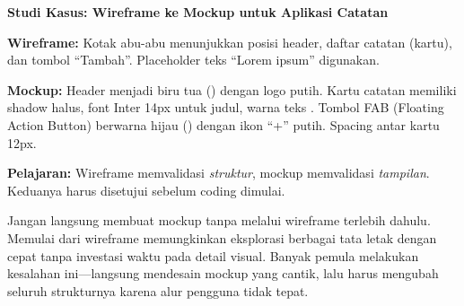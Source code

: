 \begin{contoh}
\textbf{Studi Kasus: Wireframe ke Mockup untuk Aplikasi Catatan}

\textbf{Wireframe:} Kotak abu-abu menunjukkan posisi header, daftar catatan (kartu), dan tombol ``Tambah''. Placeholder teks ``Lorem ipsum'' digunakan.

\textbf{Mockup:} Header menjadi biru tua () dengan logo putih. Kartu catatan memiliki shadow halus, font Inter 14px untuk judul, warna teks . Tombol FAB (Floating Action Button) berwarna hijau () dengan ikon ``+'' putih. Spacing antar kartu 12px.

\textbf{Pelajaran:} Wireframe memvalidasi \textit{struktur}, mockup memvalidasi \textit{tampilan}. Keduanya harus disetujui sebelum coding dimulai.
\end{contoh}

\begin{catatan}
Jangan langsung membuat mockup tanpa melalui wireframe terlebih dahulu. Memulai dari wire\-frame memungkinkan eksplorasi berbagai tata letak dengan cepat tanpa investasi waktu pada detail visual. Banyak pemula melakukan kesalahan ini---langsung mendesain mockup yang cantik, lalu harus mengubah seluruh strukturnya karena alur pengguna tidak tepat.
\end{catatan}
